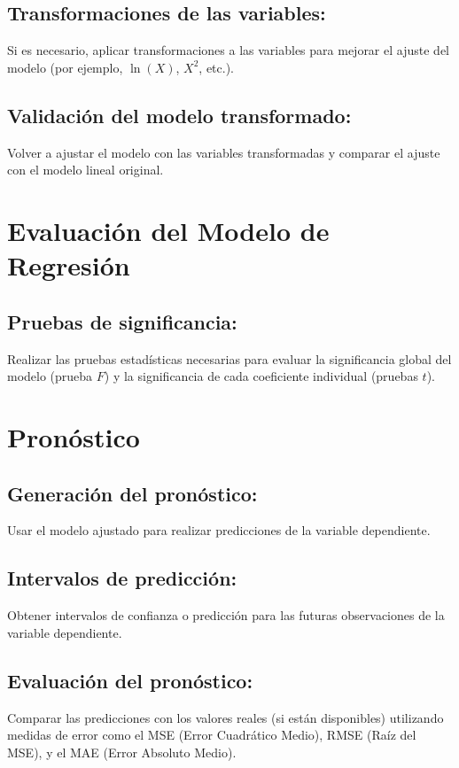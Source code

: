 \documentclass[10pt]{article}
\begin{document}
\subsection{Transformaciones de las variables:}
Si es necesario, aplicar transformaciones a las variables para mejorar el ajuste del modelo (por ejemplo, \( \ln(X) \), \( X^2 \), etc.).

\subsection{Validación del modelo transformado:}
Volver a ajustar el modelo con las variables transformadas y comparar el ajuste con el modelo lineal original.
\section{Evaluación del Modelo de Regresión}
\subsection{Pruebas de significancia:}
Realizar las pruebas estadísticas necesarias para evaluar la significancia global del modelo (prueba \(F\)) y la significancia de cada coeficiente individual (pruebas \(t\)).
\section{Pronóstico}
\subsection{Generación del pronóstico:}
Usar el modelo ajustado para realizar predicciones de la variable dependiente.

\subsection{Intervalos de predicción:}
Obtener intervalos de confianza o predicción para las futuras observaciones de la variable dependiente.

\subsection{Evaluación del pronóstico:}
Comparar las predicciones con los valores reales (si están disponibles) utilizando medidas de error como el MSE (Error Cuadrático Medio), RMSE (Raíz del MSE), y el MAE (Error Absoluto Medio).
\end{document}
